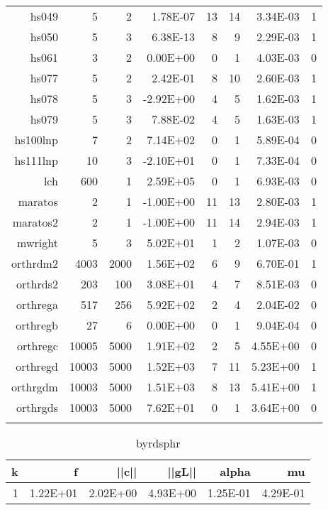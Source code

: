\documentclass[12pt]{article}
\begin{document}
\begin{center}
\begin{longtable}[htbp]{rrrrrrrr}
    hs049 & 5     & 2     & 1.78E-07 & 13    & 14    & 3.34E-03 & 1 \\
    hs050 & 5     & 3     & 6.38E-13 & 8     & 9     & 2.29E-03 & 1 \\
    hs061 & 3     & 2     & 0.00E+00 & 0     & 1     & 4.03E-03 & 0 \\
    hs077 & 5     & 2     & 2.42E-01 & 8     & 10    & 2.60E-03 & 1 \\
    hs078 & 5     & 3     & -2.92E+00 & 4     & 5     & 1.62E-03 & 1 \\
    hs079 & 5     & 3     & 7.88E-02 & 4     & 5     & 1.63E-03 & 1 \\
    hs100lnp & 7     & 2     & 7.14E+02 & 0     & 1     & 5.89E-04 & 0 \\
    hs111lnp & 10    & 3     & -2.10E+01 & 0     & 1     & 7.33E-04 & 0 \\
    lch   & 600   & 1     & 2.59E+05 & 0     & 1     & 6.93E-03 & 0 \\
    maratos & 2     & 1     & -1.00E+00 & 11    & 13    & 2.80E-03 & 1 \\
    maratos2 & 2     & 1     & -1.00E+00 & 11    & 14    & 2.94E-03 & 1 \\
    mwright & 5     & 3     & 5.02E+01 & 1     & 2     & 1.07E-03 & 0 \\
    orthrdm2 & 4003  & 2000  & 1.56E+02 & 6     & 9     & 6.70E-01 & 1 \\
    orthrds2 & 203   & 100   & 3.08E+01 & 4     & 7     & 8.51E-03 & 0 \\
    orthrega & 517   & 256   & 5.92E+02 & 2     & 4     & 2.04E-02 & 0 \\
    orthregb & 27    & 6     & 0.00E+00 & 0     & 1     & 9.04E-04 & 0 \\
    orthregc & 10005 & 5000  & 1.91E+02 & 2     & 5     & 4.55E+00 & 0 \\
    orthregd & 10003 & 5000  & 1.52E+03 & 7     & 11    & 5.23E+00 & 1 \\
    orthrgdm & 10003 & 5000  & 1.51E+03 & 8     & 13    & 5.41E+00 & 1 \\
    orthrgds & 10003 & 5000  & 7.62E+01 & 0     & 1     & 3.64E+00 & 0 \\
    \bottomrule
  \label{tab:addlabel}%
\end{longtable}%
\end{center}

\pagebreak
\begin{table}[htbp]
  \centering
  \caption{byrdsphr}
    \begin{tabular}{rrrrrr}
    \toprule
    k     & f     & ||c|| & ||gL||   & alpha & mu \\
    \midrule
    1     & 1.22E+01 & 2.02E+00 & 4.93E+00 & 1.25E-01 & 4.29E-01 \\
    \bottomrule
    \end{tabular}%
  \label{tab:addlabel}%
\end{table}%
\end{document}
